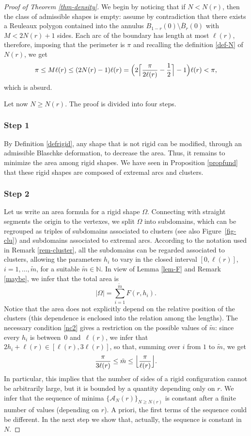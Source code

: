 \documentclass[11pt]{article}
\numberwithin{equation}{section}
\let\mathcal\mathscr
\theoremstyle{plain}
\theoremstyle{definition}
\newcommand\A{\mathcal A}
\begin{document}
\begin{proof}[Proof of Theorem \ref{thm-density}] We begin by noticing that if $N<N(r)$, then the class of admissible shapes is empty: assume by contradiction that there exists a Reuleaux polygon contained into the annulus $B_{1-r}(0)\setminus \overline{B}_r(0)$ with $M<2N(r)+1$ sides. Each arc of the boundary has length at most $\ell(r)$, therefore, imposing that the perimeter is $\pi$ and recalling the definition \eqref{def-N} of $N(r)$, we get
\[
\pi \leq M \ell(r) \leq (2N(r)-1) \ell(r)= \Bigl(2 \Bigl \lceil\frac{\pi}{2\ell(r)}-\frac12 \Bigr \rceil-1 \Bigr) \ell(r) < \pi,
\]
which is absurd.

Let now $N\geq N(r)$. The proof is divided into four steps.

\subsubsection*{Step 1} By Definition \ref{defrigid}, any shape that is not rigid can be modified, through an admissible
Blaschke deformation, to decrease the area. Thus, it remains to minimize the area
among rigid shapes. We have seen in Proposition \ref{propfund} that these rigid shapes
are composed of extremal arcs and clusters.

\subsubsection*{Step 2} Let us write an area formula for a rigid shape $\Omega$. Connecting with straight segments the origin to the vertexes, we split $\Omega$ into subdomains, which can be regrouped as triples of subdomains associated to clusters {(see also Figure~\ref{fig-clu})} and subdomains associated to extremal arcs. According to the notation used in Remark \ref{rem-cluster}, all the subdomains can be regarded associated to clusters, allowing the parameters $h_i$ to vary in the closed interval $[0,\ell(r)]$, $i=1, \ldots, \tilde{m}$, for a suitable $\tilde{m}\in \mathbb N$. In view of Lemma \ref{lem-F} and Remark \ref{maybe}, we infer that the total area is
\[
|\Omega|=\sum_{i=1}^{\tilde{m}}F(r, h_i).
\]
Notice that the area does not explicitly depend on the relative position of the clusters (this dependence is enclosed into the relation among the lengths).
The necessary condition \eqref{nc2} gives a restriction on the possible values of $\tilde{m}$: since every $h_i$ is between~$0$ and~$\ell(r)$, we infer that $2h_i + \ell(r) \in [\ell(r), 3 \ell(r)]$, so that, summing over $i$ from $1$ to $\tilde{m}$, we get
\begin{equation}\label{range}
\frac{\pi}{3\ell(r)}\leq \tilde{m} \leq \Bigl \lfloor\frac{\pi}{\ell(r)}\Bigr \rfloor.
\end{equation}
In particular, this implies that the number of sides of a rigid configuration cannot be arbitrarily large, but it is bounded by a quantity depending only on $r$. We infer that the sequence of minima $\{\A_N(r)\}_{N\geq N(r)}$ is constant after a finite number of values (depending on $r$). A priori, the first terms of the sequence could be different. In the next step we show that, actually, the sequence is constant in $N$.


\end{proof}
\end{document}
